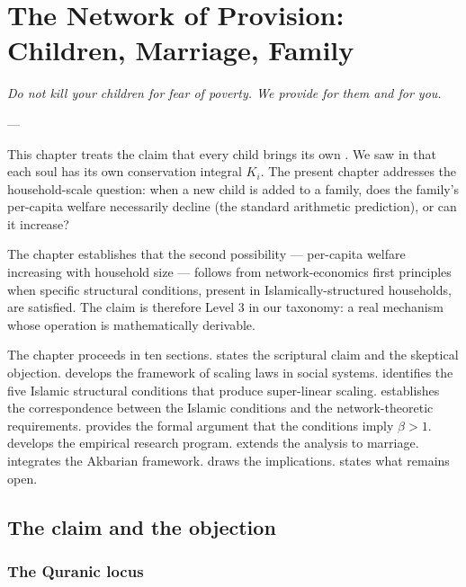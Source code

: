 \chapter{The Network of Provision: Children, Marriage, Family}
\label{ch:network-provision}

\epigraph{\itshape Do not kill your children for fear of poverty.
We provide for them and for you.}{--- }

\noindent
This chapter treats the claim that every child brings its own
. We saw in  that each soul
has its own conservation integral $K_i$. The present chapter
addresses the household-scale question: when a new child is added
to a family, does the family's per-capita welfare necessarily
decline (the standard arithmetic prediction), or can it increase?

The chapter establishes that the second possibility --- per-capita
welfare increasing with household size --- follows from
network-economics first principles when specific structural
conditions, present in Islamically-structured households, are
satisfied. The claim is therefore Level 3 in our taxonomy: a real
mechanism whose operation is mathematically derivable.

The chapter proceeds in ten sections.
 states the scriptural claim and the
skeptical objection.
 develops the framework of scaling
laws in social systems.
 identifies the five Islamic structural
conditions that produce super-linear scaling.
 establishes the correspondence
between the Islamic conditions and the network-theoretic
requirements.
 provides the formal argument that
the conditions imply $\beta > 1$.
 develops the empirical research
program.
 extends the analysis to marriage.
 integrates the Akbarian framework.
 draws the implications.
 states what remains open.

\section{The claim and the objection}
\label{sec:network-claim}

\subsection{The Quranic locus}

